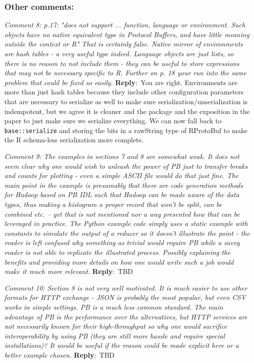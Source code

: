 \documentclass[10pt]{article}
\newcommand{\pointRaised}[2]{\smallskip %
  \textsl{{\fontseries{b}\selectfont #1}: #2}\newline}
\newcommand{\reply}[1]{\textbf{Reply}:\ #1 \smallskip } %
\begin{document}
\subsubsection*{Other comments:}

\pointRaised{Comment 8}{p.17: "does not support ... function, language or environment. Such 
  objects have no native equivalent type in Protocol Buffers, and have 
  little meaning outside the context or R"
  That is certainly false. Native mirror of environments are hash tables - 
  a very useful type indeed. Language objects are just lists, so there is
  no reason to not include them - they can be useful to store expressions
  that may not be necessary specific to R. Further on p. 18 your run into
  the same problem that could be fixed so easily.}
\reply{You are right.  Environments are more than just hash
  tables because they include other configuration parameters that are
  necessary to serialize as well to make sure
  serialization/unserialization is indempotent, but we agree it is
  cleaner and the package and the exposition in the paper to just make
  sure we serialize everything.  We can now fall back to
  \texttt{base::serialize} and storing the bits in a rawString type of
  RProtoBuf to make the R schema-less serialization more complete.}

\pointRaised{Comment 9}{The examples in sections 7 and 8 are somewhat weak. It does not seem 
  clear why one would wish to unleash the power of PB just to transfer 
  breaks and counts for plotting - even a simple ASCII file would do that
  just fine. The main point in the example is presumably that there are 
  code generation methods for Hadoop based on PB IDL such that Hadoop can
  be made aware of the data types, thus making a histogram a proper record 
  that won't be split, can be combined etc. -- yet that is not mentioned 
  nor a way presented how that can be leveraged in practice. The Python 
  example code simply uses a static example with constants to simulate the 
  output of a reducer so it doesn't illustrate the point - the reader is 
  left confused why something as trivial would require PB while a savvy 
  reader is not able to replicate the illustrated process. Possibly 
  explaining the benefits and providing more details on how one would 
  write such a job would make it much more relevant.}
\reply{TBD}


\pointRaised{Comment 10}{Section 8 is not very well motivated. It is much easier to use other 
  formats for HTTP exchange - JSON is probably the most popular, but even
  CSV works in simple settings. PB is a much less common standard. The 
  main advantage of PB is the performance over the alternatives, but HTTP
  services are not necessarily known for their high-throughput so why one
  would sacrifice interoperability by using PB (they are still more hassle 
  and require special installations)? It would be useful if the reason 
  could be made explicit here or a better example chosen.}
\reply{TBD}
\end{document}
